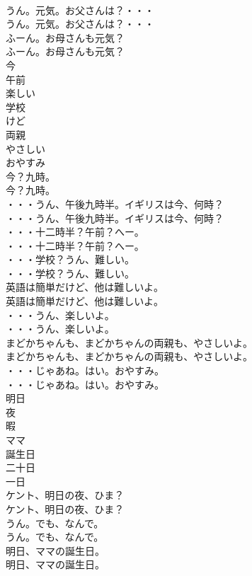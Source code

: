 \documentclass[8pt]{extreport}
\begin{document}
\begin{CJK}{UTF8}{min}
\\	うん。元気。お父さんは？・・・	
\\	うん。元気。お父さんは？・・・ 
\\	ふーん。お母さんも元気？	
\\	ふーん。お母さんも元気？ 
\\	今
\\	午前
\\	楽しい
\\	学校
\\	けど
\\	両親
\\	やさしい
\\	おやすみ
\\	今？九時。	
\\	今？九時。 
\\	・・・うん、午後九時半。イギリスは今、何時？	
\\	・・・うん、午後九時半。イギリスは今、何時？ 
\\	・・・十二時半？午前？へー。	
\\	・・・十二時半？午前？へー。 
\\	・・・学校？うん、難しい。	
\\	・・・学校？うん、難しい。 
\\	英語は簡単だけど、他は難しいよ。	
\\	英語は簡単だけど、他は難しいよ。 
\\	・・・うん、楽しいよ。	
\\	・・・うん、楽しいよ。 
\\	まどかちゃんも、まどかちゃんの両親も、やさしいよ。	
\\	まどかちゃんも、まどかちゃんの両親も、やさしいよ。 
\\	・・・じゃあね。はい。おやすみ。	
\\	・・・じゃあね。はい。おやすみ。 
\\	明日
\\	夜
\\	暇
\\	ママ
\\	誕生日
\\	二十日
\\	一日
\\	ケント、明日の夜、ひま？	
\\	ケント、明日の夜、ひま？ 
\\	うん。でも、なんで。	
\\	うん。でも、なんで。 
\\	明日、ママの誕生日。	
\\	明日、ママの誕生日。 

\end{CJK}
\end{document}
